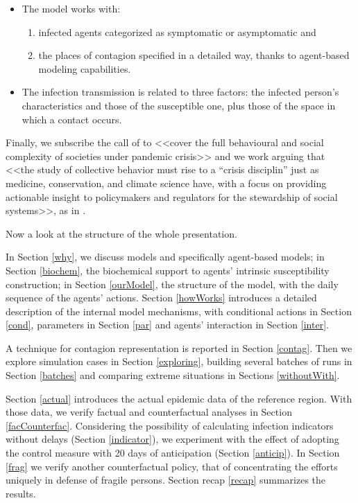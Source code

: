 \documentclass[graybox]{svmult}
\begin{document}
\begin{itemize}

\item

The model works with: 

\begin{enumerate}[label=\roman*]
\item infected agents categorized as symptomatic or asymptomatic and 
\item the places of contagion specified in a detailed way, thanks to agent-based modeling capabilities. 
\end{enumerate}

 \item
The infection transmission is related to three factors: the infected person's characteristics and those of the susceptible one, plus those of the space in which a contact occurs.

\end{itemize}


Finally, we subscribe the call of \cite{squazzoni2020} to <<cover the full behavioural and social complexity of societies under pandemic crisis>> and we work arguing that <<the study of collective behavior must rise to a ``crisis disciplin'' just as medicine, conservation, and climate science have, with a focus on providing actionable insight to policymakers and regulators for the stewardship of social systems>>, as in \cite{Bak-Colemane2025764118}. 

Now a look at the structure of the whole presentation.

In Section \ref{why}, we discuss models and specifically agent-based models; in Section \ref{biochem}, the biochemical support to agents' intrinsic susceptibility construction; in Section \ref{ourModel}, the structure of the model, with the daily sequence of the agents' actions. Section \ref{howWorks} introduces a detailed description of the internal model mechanisms, with conditional actions in Section \ref{cond}, parameters in Section \ref{par} and agents' interaction in Section \ref{inter}.

A technique for contagion representation is reported in Section \ref{contag}. Then we explore simulation cases in Section \ref{exploring}, building several batches of runs in Section \ref{batches} and comparing extreme situations in Sections \ref{withoutWith}.

Section \ref{actual} introduces the actual epidemic data of the reference region. With those data, we verify factual and counterfactual analyses in Section \ref{facCounterfac}. Considering the possibility of calculating infection indicators without delays (Section \ref{indicator}), we experiment with the effect of adopting the control measure with 20 days of anticipation (Section \ref{anticip}). In Section \ref{frag} we verify another counterfactual policy, that of concentrating the efforts uniquely in defense of fragile persons. Section recap \ref{recap} summarizes the results.
\end{document}
